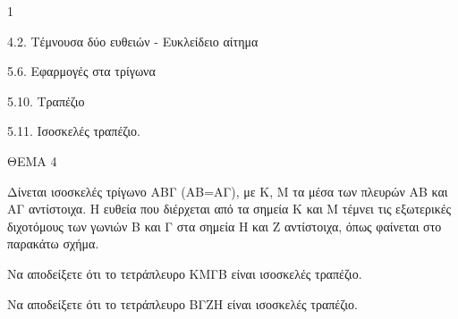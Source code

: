 \begin{ylh}{1}
    \item 4.2. Τέμνουσα δύο ευθειών - Ευκλείδειο αίτημα
    \item 5.6. Εφαρμογές στα τρίγωνα
    \item 5.10. Τραπέζιο
    \item 5.11. Ισοσκελές τραπέζιο.
\end{ylh}

ΘΕΜΑ 4

Δίνεται ισοσκελές τρίγωνο ΑΒΓ (ΑΒ=ΑΓ), με Κ, Μ τα μέσα των πλευρών ΑΒ και ΑΓ αντίστοιχα. Η ευθεία που διέρχεται από τα σημεία Κ και Μ τέμνει τις εξωτερικές διχοτόμους των γωνιών Β και Γ στα σημεία Η και Ζ αντίστοιχα, όπως φαίνεται στο παρακάτω σχήμα.

\begin{alist}
\item Να αποδείξετε ότι το τετράπλευρο ΚΜΓΒ είναι ισοσκελές τραπέζιο. 

\item Να αποδείξετε ότι το τετράπλευρο ΒΓΖΗ είναι ισοσκελές τραπέζιο. 


\begin{center}
\end{center}
\end{alist}
